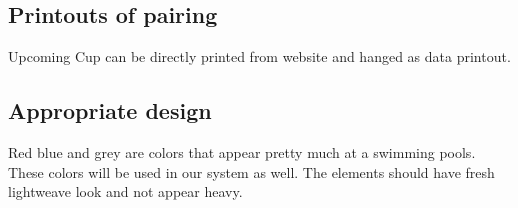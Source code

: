 \subsection*{Printouts of pairing}
Upcoming Cup can be directly printed from website and hanged as data printout. 
\subsection*{Appropriate design}
\par
Red blue and grey are colors that appear pretty much at a swimming pools. These colors will be used in our system as well. The elements should have fresh lightweave look and not appear heavy.
